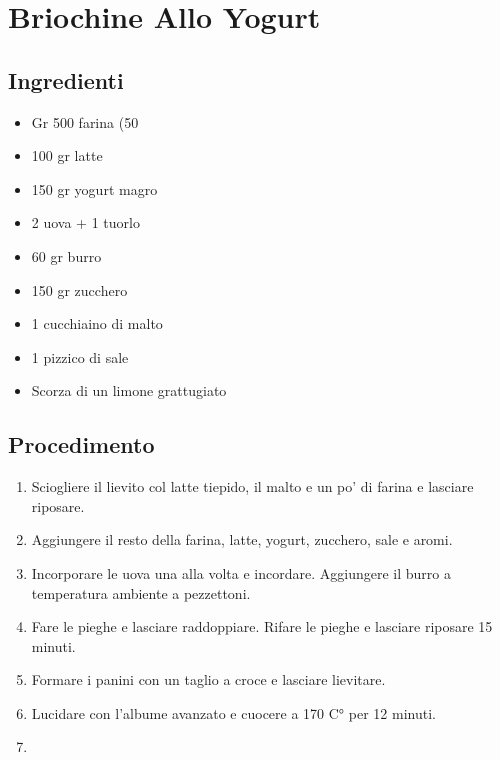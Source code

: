 \section{Briochine Allo Yogurt}
\subsection{Ingredienti}
\begin{itemize}
\item Gr 500 farina (50%
\item 100 gr latte  
\item 150 gr yogurt magro  
\item 2 uova + 1 tuorlo  
\item 60 gr burro   
\item 150 gr zucchero  
\item 1 cucchiaino di malto  
\item 1 pizzico di sale  
\item Scorza di un limone grattugiato
\end{itemize}
\subsection{Procedimento}
\begin{enumerate}
\item  Sciogliere il lievito col latte tiepido, il malto e un po' di farina e lasciare riposare.  
\item  Aggiungere il resto della farina, latte, yogurt, zucchero, sale e aromi.  
\item  Incorporare le uova una alla volta e incordare. Aggiungere il burro a temperatura ambiente a pezzettoni.  
\item  Fare le pieghe e lasciare raddoppiare. Rifare le pieghe e lasciare riposare 15 minuti.  
\item  Formare i panini con un taglio a croce e lasciare lievitare.  
\item  Lucidare con l'albume avanzato e cuocere a 170 C° per 12 minuti.  
\item   
\end{enumerate}
